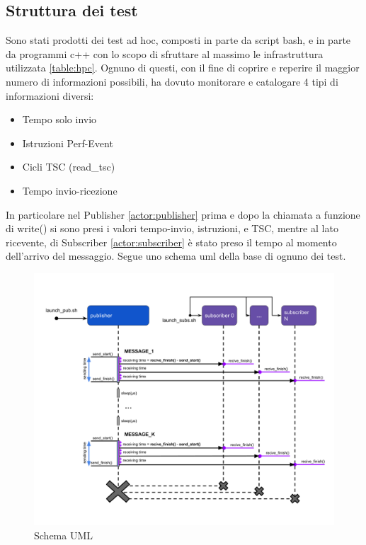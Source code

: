 \subsection{Struttura dei test}
Sono stati prodotti dei test ad hoc, composti in parte da script bash, e in parte da programmi c++ con lo scopo di sfruttare al massimo le infrastruttura utilizzata \ref{table:hpc}. Ognuno di questi, con il fine di coprire e reperire il maggior numero di informazioni possibili, ha dovuto monitorare e catalogare 4 tipi di informazioni diversi:

\begin{itemize}
    \item Tempo solo invio
    \item Istruzioni Perf-Event
    \item Cicli TSC (read\_tsc)
    \item Tempo invio-ricezione
\end{itemize}

In particolare nel Publisher \ref{actor:publisher} prima e dopo la chiamata a funzione di write() %
si sono presi i valori tempo-invio, istruzioni, e TSC, mentre al lato ricevente, di Subscriber \ref{actor:subscriber} è stato preso il tempo al momento dell'arrivo del messaggio. Segue uno schema uml della base di ognuno dei test.
\begin{figure}[H]
    \centering
    \includegraphics[width=\textwidth]{./img/umel-send-receive.png}
    \caption{Schema UML} %
    \label{fig:uml}
\end{figure}

